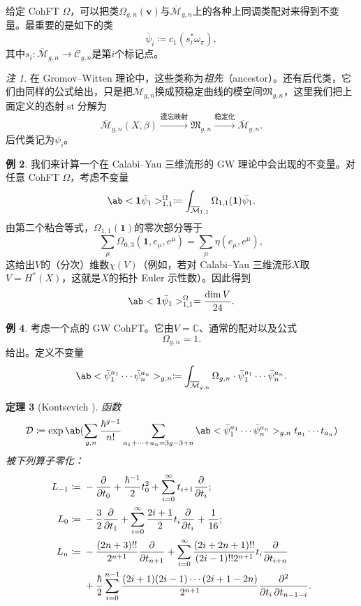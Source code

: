 \documentclass{amsart}
\newtheorem{thm}{定理}[section]
\theoremstyle{definition}
\newtheorem{exm}[thm]{例}
\theoremstyle{remark}
\newtheorem{rmk}[thm]{注}
\theoremstyle{plain}
\theoremstyle{definition}
\theoremstyle{remark}
\newcommand{\C}{\mathbb{C}}
\newcommand{\Mbar}{\overline{\mathcal{M}}}
\newcommand{\mc}[1]{\mathcal{#1}}
\newcommand{\mf}[1]{\mathfrak{#1}}
\newcommand{\mbf}[1]{\mathbf{#1}}
\newcommand{\bv}{\mbf{v}}
\newcommand{\1}{\mathbf{1}}
\newcommand{\2}{\mathbf{2}}
\newcommand{\3}{\mathbf{3}}
\DeclareMathOperator{\st}{st}
\begin{document}
给定 CohFT $\Omega$，可以把类$\Omega_{g,n}(\bv)$与$\Mbar_{g,n}$上的各种上同调类配对来得到不变量。最重要的是如下的类
\[ \bar{\psi}_i \coloneqq c_1( s_i^* \omega_{\pi} ), \]
其中$s_i \colon \Mbar_{g,n} \to \mc{C}_{g,n}$是第$i$个标记点。

\begin{rmk}
    在 Gromov--Witten 理论中，这些类称为\textit{祖先}（ancestor）。还有后代类，它们由同样的公式给出，只是把$\Mbar_{g,n}$换成预稳定曲线的模空间$\mf{M}_{g,n}$，这里我们把上面定义的态射$\st$分解为
    \[ \Mbar_{g,n}(X,\beta) \xrightarrow{\text{遗忘映射}} \mf{M}_{g,n} \xrightarrow{\text{稳定化}} \Mbar_{g,n}. \]
    后代类记为$\psi_i$。
\end{rmk}

\begin{exm}
    我们来计算一个在 Calabi--Yau 三维流形的 GW 理论中会出现的不变量。对任意 CohFT $\Omega$，考虑不变量
    \[ \ab<\1\bar{\psi}_1>_{1,1}^{\Omega}\coloneqq \int_{\Mbar_{1,1}} \Omega_{1,1}(\1)\bar{\psi}_1. \]
    由第二个粘合等式，$\Omega_{1,1}(\1)$的零次部分等于
    \[ \sum_{\mu} \Omega_{0,3}(\1, e_{\mu}, e^{\mu}) = \sum_{\mu} \eta(e_{\mu}, e^{\mu}), \]
    这给出$V$的（分次）维数$\chi(V)$（例如，若对 Calabi--Yau 三维流形\(X\)取\(V = H^*(X)\)，这就是\(X\)的拓扑 Euler 示性数）。因此得到
    \[ \ab<\1\bar{\psi}_1>_{1,1}^{\Omega} = \frac{\dim V}{24}. \]
\end{exm}

\begin{exm}
    考虑一个点的 GW CohFT。它由$V = \C$、通常的配对以及公式
    \[ \Omega_{g,n} = 1. \]
    给出。定义不变量
    \[ \ab<\bar{\psi}_1^{a_1} \cdots \bar{\psi}_n^{a_n}>_{g,n} \coloneqq \int_{\Mbar_{g,n}} \Omega_{g,n} \cdot \bar{\psi}_1^{a_1} \cdots \bar{\psi}_n^{a_n}. \]
    \begin{thm}[Kontsevich {\cite{Kontsevich1992}}]
        函数
        \[ \mc{D} \coloneqq \exp \ab(\sum_{g,n} \frac{\hbar^{g-1}}{n!}\sum_{a_1 + \cdots + a_n = 3g-3+n} \ab<\bar{\psi}_1^{a_1} \cdots \bar{\psi}_n^{a_n}>_{g,n} t_{a_1}\cdots t_{a_n}) \]
        被下列算子零化：
        \begin{align*}
            L_{-1} \coloneqq{}& -\pdv{}{t_0} + \frac{\hbar^{-1}}{2} t_0^2 + \sum_{i=0}^{\infty} t_{i+1} \pdv{}{t_i};\\
            L_0 \coloneqq{}& -\frac{3}{2} \pdv{}{t_1} + \sum_{i=0}^{\infty} \frac{2i+1}{2} t_i \pdv{}{t_i} + \frac{1}{16};\\
            L_n \coloneqq{}& -\frac{(2n+3)!!}{2^{n+1}} \pdv{}{t_{n+1}} + \sum_{i=0}^{\infty} \frac{(2i+2n+1)!!}{(2i-1)!! 2^{n+1}} t_i \pdv{}{t_{i+n}} \\
            &+ \frac{\hbar}{2} \sum_{i=0}^{n-1} \frac{(2i+1) (2i-1) \cdots (2i+1-2n)}{2^{n+1}} \pdv{}{t_i,t_{n-1-i}}.
        \end{align*}
    \end{thm}
\end{exm}
\end{document}
